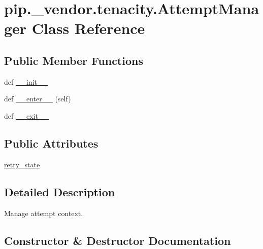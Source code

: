 \hypertarget{classpip_1_1__vendor_1_1tenacity_1_1AttemptManager}{}\section{pip.\+\_\+vendor.\+tenacity.\+Attempt\+Manager Class Reference}
\label{classpip_1_1__vendor_1_1tenacity_1_1AttemptManager}
\subsection*{Public Member Functions}
\begin{DoxyCompactItemize}
\item 
def \hyperlink{classpip_1_1__vendor_1_1tenacity_1_1AttemptManager_a0d2e76b04821b56536a38d493b1d8015}{\+\_\+\+\_\+init\+\_\+\+\_\+}
\item 
def \hyperlink{classpip_1_1__vendor_1_1tenacity_1_1AttemptManager_ab2f65feb8861693aca5d16bb121a37d5}{\+\_\+\+\_\+enter\+\_\+\+\_\+} (self)
\item 
def \hyperlink{classpip_1_1__vendor_1_1tenacity_1_1AttemptManager_ad6db52985e0712d4f1ef00861f7f7d7e}{\+\_\+\+\_\+exit\+\_\+\+\_\+}
\end{DoxyCompactItemize}
\subsection*{Public Attributes}
\begin{DoxyCompactItemize}
\item 
\hyperlink{classpip_1_1__vendor_1_1tenacity_1_1AttemptManager_a6d09c0f551a44ff712d7ac23d17b03d7}{retry\+\_\+state}
\end{DoxyCompactItemize}


\subsection{Detailed Description}
\begin{DoxyVerb}Manage attempt context.\end{DoxyVerb}
 

\subsection{Constructor \& Destructor Documentation}
\mbox{\label{classpip_1_1__vendor_1_1tenacity_1_1AttemptManager_a0d2e76b04821b56536a38d493b1d8015}} 

